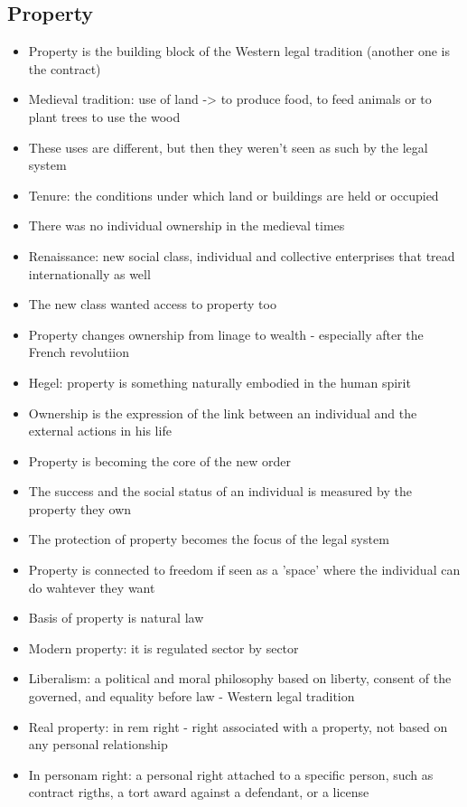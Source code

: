 \documentclass{article}
\begin{document}
\subsection{Property}
\begin{itemize}
\item Property is the building block of the Western legal tradition (another one is the contract)
\item Medieval tradition: use of land -> to produce food, to feed animals or to plant trees to use the wood 
\item These uses are different, but then they weren't seen as such by the legal system
\item Tenure: the conditions under which land or buildings are held or occupied 
\item There was no individual ownership in the medieval times 
\item Renaissance: new social class, individual and collective enterprises that tread internationally as well
\item The new class wanted access to property too
\item Property changes ownership from linage to wealth - especially after the French revolutiion
\item Hegel: property is something naturally embodied in the human spirit 
\item Ownership is the expression of the link between an individual and the external actions in his life 
\item Property is becoming the core of the new order 
\item The success and the social status of an individual is measured by the property they own
\item The protection of property becomes the focus of the legal system
\item Property is connected to freedom if seen as a 'space' where the individual can do wahtever they want 
\item Basis of property is natural law 
\item Modern property: it is regulated sector by sector 
\item Liberalism: a political and moral philosophy based on liberty, consent of the governed, and equality before law - Western legal tradition
\item Real property: in rem right - right associated with a property, not based on any personal relationship 
\item In personam right: a personal right attached to a specific person, such as contract rigths, a tort award against a defendant, or a license 

\end{itemize}
\end{document}
